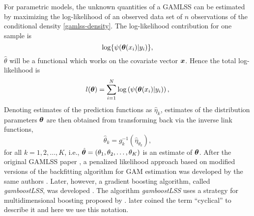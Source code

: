 For parametric models, the unknown quantities of a GAMLSS can be estimated by maximizing the log-likelihood of an observed data set of $n$ observations of the conditional density \eqref{gamlss-density}.
The log-likelihood contribution for one sample is
\begin{equation*}
    \log\{\psi(\boldsymbol{\theta}(x_i)|y_i)\},
\end{equation*}
$\hat{\theta}$ will be a functional which works on the covariate vector $\bm{x}$.
Hence the total log-likelihood is
\begin{equation*}
    l(\boldsymbol{\theta})=\sum_{i=1}^N\log\left(\psi(\boldsymbol{\theta}(x_i)|y_i)\right),
\end{equation*}
Denoting estimates of the prediction functions as $\hat{\eta}_k$, estimates of the distribution parameters $\boldsymbol{\theta}$ are then obtained from transforming back via the inverse link functions,
\begin{equation*}
    \hat{\theta}_k=g_k^{-1}(\hat{\eta}_{\theta_k}),
\end{equation*}
for all $k=1,2,\ldots,K$, i.e., $\hat{\boldsymbol{\theta}}=\left(\theta_1,\theta_2,\ldots,\theta_K\right)$ is an estimate of $\boldsymbol{\theta}$.
After the original GAMLSS paper \citep{gamlss}, a penalized likelihood approach based on modified versions of the backfitting algorithm for GAM estimation was developed by the same authors \citep{gamlssR}.
Later, however, a gradient boosting algorithm, called \textit{gamboostLSS}, was developed \citep{gamboostlss-paper}.
The algorithm \textit{gamboostLSS} uses a strategy for multidimensional boosting proposed by \citet{schmid}.
\citet{thomas2018} later coined the term ``cyclical'' to describe it and here we use this notation.

